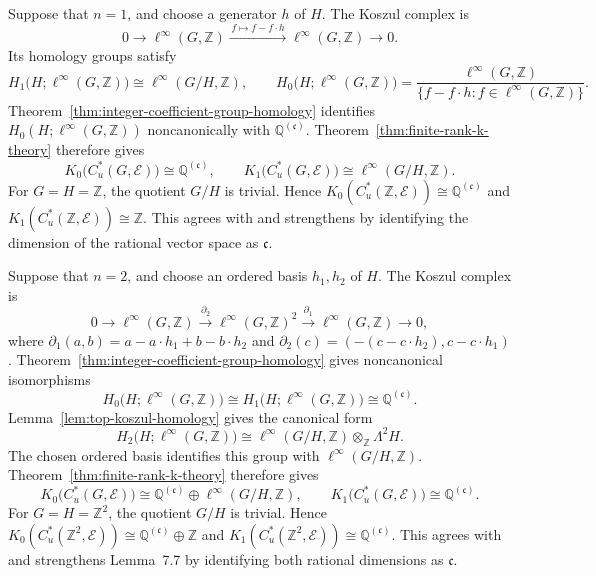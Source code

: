 \documentclass[pdflatex,sn-mathphys-num]{sn-jnl}%
\theoremstyle{plain}
\theoremstyle{remark}
\theoremstyle{definition}
\numberwithin{equation}{section}
\begin{document}
Suppose that \( n=1 \), and choose a generator \( h \) of \( H \). The Koszul complex is
\[
0
\longrightarrow
\ell^\infty(G,\mathbb Z)
\xrightarrow{\,f\mapsto f-f\cdot h\,}
\ell^\infty(G,\mathbb Z)
\longrightarrow
0.
\]
Its homology groups satisfy
\[
H_1\bigl(H;\ell^\infty(G,\mathbb Z)\bigr)
\cong
\ell^\infty(G/H,\mathbb Z),
\qquad
H_0\bigl(H;\ell^\infty(G,\mathbb Z)\bigr)
=
\frac{\ell^\infty(G,\mathbb Z)}
{\{f-f\cdot h:f\in\ell^\infty(G,\mathbb Z)\}}.
\]
Theorem~\ref{thm:integer-coefficient-group-homology} identifies \( H_0(H;\ell^\infty(G,\mathbb Z)) \) noncanonically with \( \mathbb Q^{(\mathfrak c)} \). Theorem~\ref{thm:finite-rank-k-theory} therefore gives
\[
K_0\bigl(C_u^*(G,\mathcal E)\bigr)
\cong
\mathbb Q^{(\mathfrak c)},
\qquad
K_1\bigl(C_u^*(G,\mathcal E)\bigr)
\cong
\ell^\infty(G/H,\mathbb Z).
\]
For \( G=H=\mathbb Z \), the quotient \( G/H \) is trivial. Hence \( K_0(C_u^*(\mathbb Z,\mathcal E))\cong\mathbb Q^{(\mathfrak c)} \) and \( K_1(C_u^*(\mathbb Z,\mathcal E))\cong\mathbb Z \). This agrees with \cite[Proposition~6.1]{Kato_2021} and strengthens \cite[Proposition~6.3]{Kato_2021} by identifying the dimension of the rational vector space as \( \mathfrak c \).

Suppose that \( n=2 \), and choose an ordered basis \( h_1,h_2 \) of \( H \). The Koszul complex is
\[
0
\longrightarrow
\ell^\infty(G,\mathbb Z)
\xrightarrow{\partial_2}
\ell^\infty(G,\mathbb Z)^2
\xrightarrow{\partial_1}
\ell^\infty(G,\mathbb Z)
\longrightarrow
0,
\]
where \( \partial_1(a,b)=a-a\cdot h_1+b-b\cdot h_2 \) and \( \partial_2(c)=(-(c-c\cdot h_2),c-c\cdot h_1) \). Theorem~\ref{thm:integer-coefficient-group-homology} gives noncanonical isomorphisms
\[
H_0\bigl(H;\ell^\infty(G,\mathbb Z)\bigr)
\cong
H_1\bigl(H;\ell^\infty(G,\mathbb Z)\bigr)
\cong
\mathbb Q^{(\mathfrak c)}.
\]
Lemma~\ref{lem:top-koszul-homology} gives the canonical form
\[
H_2\bigl(H;\ell^\infty(G,\mathbb Z)\bigr)
\cong
\ell^\infty(G/H,\mathbb Z)\otimes_{\mathbb Z}\Lambda^2H.
\]
The chosen ordered basis identifies this group with \( \ell^\infty(G/H,\mathbb Z) \). Theorem~\ref{thm:finite-rank-k-theory} therefore gives
\[
K_0\bigl(C_u^*(G,\mathcal E)\bigr)
\cong
\mathbb Q^{(\mathfrak c)}
\oplus
\ell^\infty(G/H,\mathbb Z),
\qquad
K_1\bigl(C_u^*(G,\mathcal E)\bigr)
\cong
\mathbb Q^{(\mathfrak c)}.
\]
For \( G=H=\mathbb Z^2 \), the quotient \( G/H \) is trivial. Hence \( K_0(C_u^*(\mathbb Z^2,\mathcal E))\cong\mathbb Q^{(\mathfrak c)}\oplus\mathbb Z \) and \( K_1(C_u^*(\mathbb Z^2,\mathcal E))\cong\mathbb Q^{(\mathfrak c)} \). This agrees with \cite[Lemmas~7.2, 7.6, and 7.7]{Kato_2021} and strengthens Lemma~7.7 by identifying both rational dimensions as \( \mathfrak c \).
\end{document}
